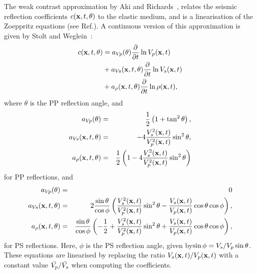 The weak contrast approximation by Aki and Richards~\cite{aki80},
relates the seismic reflection coefficients $c(\mathbf{x},t,\theta)$
to the elastic medium, and is a linearisation of the Zoeppritz
equations (see Ref.\cite{aki80}). A continuous version of this
approximation is given by Stolt and Weglein~\cite{stolt85}:
%
\begin{equation}
\begin{split}
\label{eq:aki_c}
  c(\mathbf{x},t,\theta)
  & = a_{V\!p} (\theta) \frac{\partial}{\partial t}\ln V_p (\mathbf{x},t)\\
  & + a_{V\!s} (\mathbf{x},t,\theta) \frac{\partial}{\partial t}\ln V_s (\mathbf{x},t)\\
  & + a_\rho(\mathbf{x},t,\theta) \frac{\partial}{\partial t}\ln\rho(\mathbf{x},t),
\end{split}
\end{equation}
%
where $\theta$ is the PP reflection angle, and
%
\begin{eqnarray}
  a_{V\!p} (\theta)            &=& \frac{1}{2}\left(1 + \tan^2\theta\right), \nonumber \\
  a_{V\!s} (\mathbf{x},t,\theta) &=& -4 \frac{V_s^2(\mathbf{x},t)}
                                         {V_p^2(\mathbf{x},t)}\sin^2\theta, \label{a_coef_pp}\\
  a_\rho(\mathbf{x},t,\theta)    &=& \frac{1}{2}\left(1
                                   -4\frac{V_s^2(\mathbf{x},t)}{V_p^2(\mathbf{x},t)}
                                        \sin^2\theta\right)\nonumber
\end{eqnarray}
%
for PP reflections, and
\begin{eqnarray}
  a_{V\!p} (\theta)            &=& 0 \nonumber \\
  a_{V\!s} (\mathbf{x},t,\theta) &=& 2 \frac{\sin\theta}{\cos\phi}\left(\frac{V_s^2(\mathbf{x},t)}
                                         {V_p^2(\mathbf{x},t)}\sin^2\theta - \frac{V_s(\mathbf{x},t)}{V_p(\mathbf{x},t)}\cos\theta\cos\phi\right)
                                         , \label{a_coef_ps}\\
  a_\rho(\mathbf{x},t,\theta)    &=& \frac{\sin\theta}{\cos\phi}\left(-\frac{1}{2}+\frac{V_s^2(\mathbf{x},t)}
                                         {V_p^2(\mathbf{x},t)}\sin^2\theta + \frac{V_s(\mathbf{x},t)}{V_p(\mathbf{x},t)}\cos\theta\cos\phi\right)
                                         , \nonumber
\end{eqnarray}
for PS reflections. Here, $\phi$ is the PS reflection angle, given by$\sin\phi = V_s/V_p\sin\theta$.
These equations are linearised by replacing the ratio
$V_s(\mathbf{x},t)/V_p(\mathbf{x},t)$ with a constant value
$\bar{V_p}/\bar{V_s}$ when computing the coefficients.

